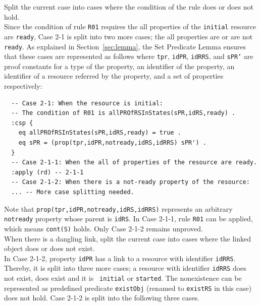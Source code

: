 \documentclass[12pt]{report}
\newcommand{\stt}[1]{{\small{\tt {#1}}}}
\begin{document}
 Split the current case into cases where
the condition of the rule does or does not hold. \\
Since the condition of rule {\tt R01} requires the all properties of the
{\tt initial} resource are {\tt ready}, Case 2-1 is split into two
more cases; the all properties are or are not {\tt ready}. As explained in
Section~\ref{sec:lemma}, the Set Predicate Lemma ensures that these cases are
represented as follows where {\tt tpr}, {\tt idPR}, {\tt idRRS}, and
{\tt sPR'} are proof constants for a type of the property, an
identifier of the property, an identifier of a resource referred by
the property, and a set of properties respectively:
\small
\begin{verbatim}
  -- Case 2-1: When the resource is initial:
  -- The condition of R01 is allPROfRSInStates(sPR,idRS,ready) .
  :csp { 
    eq allPROfRSInStates(sPR,idRS,ready) = true .
    eq sPR = (prop(tpr,idPR,notready,idRS,idRRS) sPR') .
  }
  -- Case 2-1-1: When the all of properties of the resource are ready.
  :apply (rd) -- 2-1-1
  -- Case 2-1-2: When there is a not-ready property of the resource:
  ... -- More case splitting needed.
\end{verbatim}
\normalsize
Note that \stt{prop(tpr,idPR,notready,idRS,idRRS)} represents an
arbitrary {\tt notready} property whose parent is {\tt idRS}. In Case
2-1-1, rule {\tt R01} can be applied, which means \stt{cont(S)} holds. Only
Case 2-1-2 remains unproved.\\

 When there is a dangling link, split the
current case into cases where the linked object does or does not
exist. \\
In Case 2-1-2, property {\tt idPR} has a link to a resource with identifier
{\tt idRRS}. Thereby, it is split into three more cases; a resource
with identifier {\tt idRRS} does not exist, does exist and it is {\tt
  initial} or {\tt started}. The nonexistence can be represented as
predefined predicate {\tt existObj} (renamed to {\tt existRS} in this
case) does not hold. Case 2-1-2 is split into the following three
cases.
\end{document}

